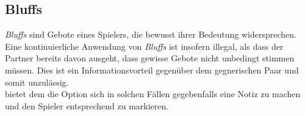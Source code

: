 \subsection{Bluffs}

\noindent
\textit{Bluffs} sind Gebote eines Spielers, die bewusst ihrer Bedeutung widersprechen.\\[.1cm]
Eine kontinuierliche Anwendung von \textit{Bluffs} ist insofern illegal, als dass
der Partner bereits davon ausgeht, dass gewisse Gebote nicht unbedingt stimmen müssen.
Dies ist ein Informationsvorteil gegenüber dem gegnerischen Paar und somit unzulässig.\\[.2cm]
\bb bietet dem \tl die Option sich in solchen Fällen gegebenfalls eine Notiz zu machen und den
Spieler entsprechend zu markieren.
